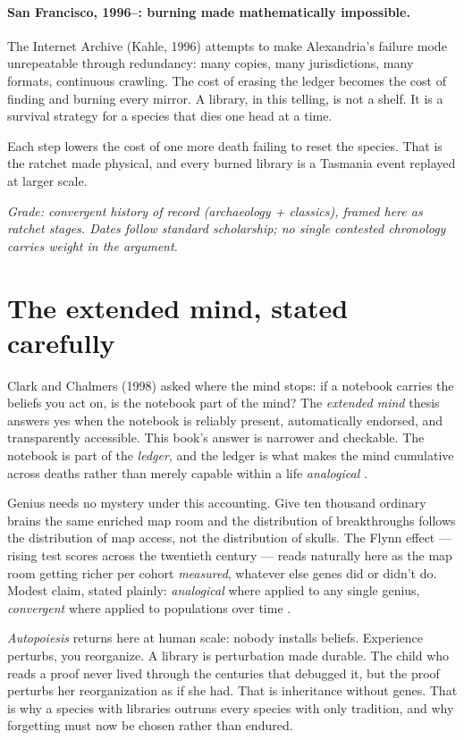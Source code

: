 \paragraph{San Francisco, 1996--: burning made mathematically impossible.} The Internet Archive (Kahle, 1996) attempts to make Alexandria's failure mode unrepeatable through redundancy: many copies, many jurisdictions, many formats, continuous crawling. The cost of erasing the ledger becomes the cost of finding and burning every mirror. A library, in this telling, is not a shelf. It is a survival strategy for a species that dies one head at a time.

Each step lowers the cost of one more death failing to reset the species. That is the ratchet made physical, and every burned library is a Tasmania event replayed at larger scale.

\textit{Grade: convergent history of record (archaeology + classics), framed here as ratchet stages. Dates follow standard scholarship; no single contested chronology carries weight in the argument.}

\section{The extended mind, stated carefully}

Clark and Chalmers (1998) asked where the mind stops: if a notebook carries the beliefs you act on, is the notebook part of the mind? The \textit{extended mind} thesis answers yes when the notebook is reliably present, automatically endorsed, and transparently accessible. This book's answer is narrower and checkable. The notebook is part of the \textit{ledger}, and the ledger is what makes the mind cumulative across deaths rather than merely capable within a life \textit{analogical} \citep{clark2016}.

Genius needs no mystery under this accounting. Give ten thousand ordinary brains the same enriched map room and the distribution of breakthroughs follows the distribution of map access, not the distribution of skulls. The Flynn effect --- rising test scores across the twentieth century --- reads naturally here as the map room getting richer per cohort \textit{measured}, whatever else genes did or didn't do. Modest claim, stated plainly: \textit{analogical} where applied to any single genius, \textit{convergent} where applied to populations over time \citep{henrich,tomasello}.

\textit{Autopoiesis} \citep{maturana1980} returns here at human scale: nobody installs beliefs. Experience perturbs, you reorganize. A library is perturbation made durable. The child who reads a proof never lived through the centuries that debugged it, but the proof perturbs her reorganization as if she had. That is inheritance without genes. That is why a species with libraries outruns every species with only tradition, and why forgetting must now be chosen rather than endured.

